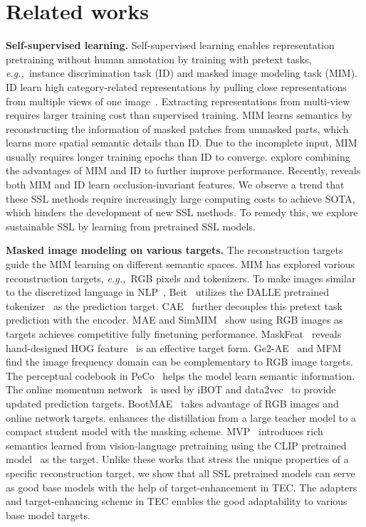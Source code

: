 \documentclass{article} \usepackage{iclr2023_conference,times}
\newcommand{\myPara}[1]{\vspace{-.05in} \noindent\textbf{#1}}
\def\eg{\emph{e.g.,~}}
\begin{document}
\section{Related works}
\vspace{-2pt}
\label{sec:tab}
\myPara{Self-supervised learning.}
Self-supervised learning enables representation pretraining without human annotation
by training with pretext tasks, \eg instance discrimination task (ID)
and masked image modeling task (MIM).
ID learn high category-related representations by pulling close representations from multiple views of one image~\cite{chen2020simple,byol,Chen_2021_CVPR,barlow_Twins,caron2020unsupervised}.
Extracting representations from multi-view requires larger training cost than supervised training.
MIM learns semantics by reconstructing the information of masked patches from unmasked parts,
which learns more spatial semantic details than ID.
Due to the incomplete input, MIM
usually requires longer training epochs than ID to converge.
\citep{huang2022contrastive,wang2022repre} explore combining the advantages of MIM and ID to further improve performance.
Recently, \citep{kong2022understanding} reveals both MIM and ID learn occlusion-invariant features.
We observe a trend that these SSL methods require increasingly large computing costs to achieve SOTA, which hinders the development of new SSL methods.
To remedy this, we explore sustainable SSL by learning from pretrained SSL models.


\myPara{Masked image modeling on various targets.}
The reconstruction targets guide the MIM learning on different semantic spaces. 
MIM has explored various reconstruction targets, \eg RGB pixels and tokenizers.
To make images similar to the discretized language in NLP~\citep{devlin2018bert},  
Beit~\citep{bao2021beit}
utilizes the DALLE pretrained tokenizer~\citep{ramesh2021zero}
as the prediction target.
CAE~\citep{chen2022context} further decouples this pretext task prediction with the encoder. 
MAE and SimMIM~\citep{xie2022simmim} show using RGB images as targets achieves competitive fully finetuning performance.
MaskFeat~\citep{wei2022masked} reveals hand-designed HOG feature~\citep{dalal2005histograms} is an effective target form.
Ge2-AE~\citep{liu2022devil} and MFM~\citep{xie2022masked} find the image frequency domain can be complementary to RGB image targets.
The perceptual codebook in PeCo~\citep{dong2021peco} helps the model learn semantic information.
The online momentum network~\citep{He_2020_CVPR}
is used by iBOT and data2vec~\citep{baevski2022data2vec}
to provide updated prediction targets.
BootMAE~\citep{dong2022ict} takes advantage of RGB images and online network
targets.
\citep{yang2022masked} enhances the distillation from a large teacher model to a compact student
model with the masking scheme.
MVP~\citep{wei2022mvp} introduces rich semantics learned from vision-language pretraining
using the CLIP pretrained model~\citep{ramesh2021zero} as the target.
Unlike these works that stress the unique properties of a specific reconstruction target,
we show that all SSL pretrained models can serve as good base models with the help of target-enhancement in TEC.
The adapters and target-enhancing scheme
in TEC enables the good adaptability to various base model targets.
\end{document}
